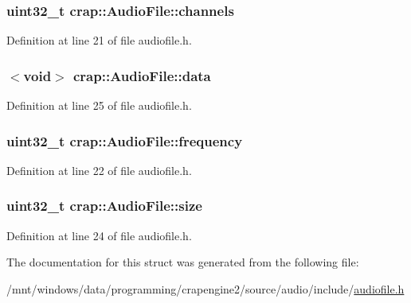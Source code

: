 \hypertarget{structcrap_1_1_audio_file_a78b93f01a2e9b481371ef7c64b7fabb4}{}
\subsubsection[{channels}]{\setlength{\rightskip}{0pt plus 5cm}uint32\+\_\+t crap\+::\+Audio\+File\+::channels}\label{structcrap_1_1_audio_file_a78b93f01a2e9b481371ef7c64b7fabb4}


Definition at line 21 of file audiofile.\+h.

\hypertarget{structcrap_1_1_audio_file_a0c75cc1dfed89dc59fb3868cdf2a8b2e}{}
\subsubsection[{data}]{$<$void$>$ crap\+::\+Audio\+File\+::data}\label{structcrap_1_1_audio_file_a0c75cc1dfed89dc59fb3868cdf2a8b2e}


Definition at line 25 of file audiofile.\+h.

\hypertarget{structcrap_1_1_audio_file_ae5c7beff491714d262eea53b7760f1a2}{}
\subsubsection[{frequency}]{\setlength{\rightskip}{0pt plus 5cm}uint32\+\_\+t crap\+::\+Audio\+File\+::frequency}\label{structcrap_1_1_audio_file_ae5c7beff491714d262eea53b7760f1a2}


Definition at line 22 of file audiofile.\+h.

\hypertarget{structcrap_1_1_audio_file_ad5c536e16fbd38393346b0bc2c7ba099}{}
\subsubsection[{size}]{\setlength{\rightskip}{0pt plus 5cm}uint32\+\_\+t crap\+::\+Audio\+File\+::size}\label{structcrap_1_1_audio_file_ad5c536e16fbd38393346b0bc2c7ba099}


Definition at line 24 of file audiofile.\+h.



The documentation for this struct was generated from the following file\+:\begin{DoxyCompactItemize}
\item 
/mnt/windows/data/programming/crapengine2/source/audio/include/\hyperlink{audiofile_8h}{audiofile.\+h}\end{DoxyCompactItemize}
